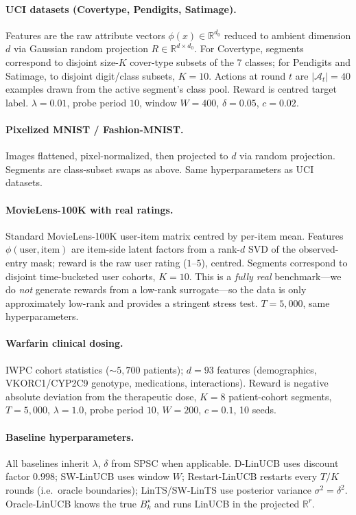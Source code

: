 \documentclass{article}
\newcommand{\R}{\mathbb{R}}
\newcommand{\cA}{\mathcal{A}}
\begin{document}
\paragraph{UCI datasets (Covertype, Pendigits, Satimage).}
Features are the raw attribute vectors $\phi(x)\in\R^{d_0}$ reduced to
ambient dimension $d$ via Gaussian random projection
$R\in\R^{d\times d_0}$. For Covertype, segments correspond to disjoint
size-$K$ cover-type subsets of the 7 classes; for Pendigits and
Satimage, to disjoint digit/class subsets, $K=10$. Actions at round
$t$ are $|\cA_t|=40$ examples drawn from the active segment's class
pool. Reward is centred target label. $\lambda=0.01$, probe
period $10$, window $W=400$, $\delta=0.05$, $c=0.02$.

\paragraph{Pixelized MNIST / Fashion-MNIST.}
Images flattened, pixel-normalized, then projected to $d$ via random
projection. Segments are class-subset swaps as above. Same
hyperparameters as UCI datasets.

\paragraph{MovieLens-100K with real ratings.}
Standard MovieLens-100K user-item matrix centred by per-item mean.
Features $\phi(\text{user},\text{item})$ are item-side latent
factors from a rank-$d$ SVD of the observed-entry mask; reward is
the raw user rating ($1$--$5$), centred. Segments correspond to
disjoint time-bucketed user cohorts, $K=10$. This is a
\emph{fully real} benchmark---we do \emph{not} generate rewards from
a low-rank surrogate---so the data is only approximately low-rank and
provides a stringent stress test. $T=5{,}000$, same hyperparameters.

\paragraph{Warfarin clinical dosing.}
IWPC cohort statistics (${\sim}5{,}700$ patients); $d=93$ features
(demographics, VKORC1/CYP2C9 genotype, medications, interactions).
Reward is negative absolute deviation from the therapeutic dose,
$K=8$ patient-cohort segments, $T=5{,}000$, $\lambda=1.0$, probe
period $10$, $W=200$, $c=0.1$, 10 seeds.

\paragraph{Baseline hyperparameters.}
All baselines inherit $\lambda$, $\delta$ from SPSC when applicable.
D-LinUCB uses discount factor $0.998$; SW-LinUCB uses window $W$;
Restart-LinUCB restarts every $T/K$ rounds (i.e.\ oracle boundaries);
LinTS/SW-LinTS use posterior variance $\sigma^2 = \delta^2$.
Oracle-LinUCB knows the true $B_k^\star$ and runs LinUCB in the
projected $\R^r$.
\end{document}
